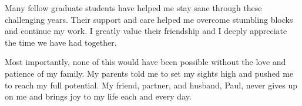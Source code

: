 \documentclass{ucbthesis}
\begin{document}
\begin{frontmatter}
\begin{acknowledgements}
Many fellow graduate students have helped me stay sane through these challenging years. Their support and care helped me overcome stumbling blocks and continue my work. I greatly value their friendship and I deeply appreciate the time we have had together.

Most importantly, none of this would have been possible without the love and patience of my family. My parents told me to set my sights high and pushed me to reach my full potential. My friend, partner, and husband, Paul, never gives up on me and brings joy to my life each and every day.
\end{acknowledgements}

\end{frontmatter}



\pagestyle{headings}











\printbibliography

\appendix
 

\end{document}
